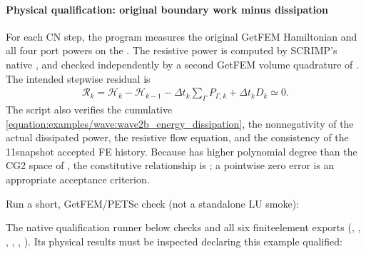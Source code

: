 \documentclass[letterpaper,10pt,english]{sphinxmanual}
\begin{document}
\paragraph{Physical qualification: original boundary work minus dissipation}
\label{\detokenize{examples/wave:physical-qualification-original-boundary-work-minus-dissipation}}
\sphinxAtStartPar
For each  CN step, the program measures the original
GetFEM Hamiltonian and all four port powers on the . The resistive power is computed by
SCRIMP’s native , and checked independently
by a second GetFEM volume quadrature of .
The intended stepwise residual is
\begin{equation*}
\begin{split}\mathcal R_k
=\mathcal H_k-\mathcal H_{k-1}
-\Delta t_k\sum_{\Gamma}P_{\Gamma,k}
+\Delta t_k D_k \simeq0.\end{split}
\end{equation*}
\sphinxAtStartPar
The script also verifies the cumulative
\eqref{equation:examples/wave:wave2b_energy_dissipation}, the nonnegativity
of the actual dissipated power, the resistive
flow equation, and the consistency of the
11\sphinxhyphen{}snapshot accepted FE history. Because
 has higher polynomial degree than
the CG2 space of , the constitutive
relationship is ;
a pointwise zero  error is 
an appropriate acceptance criterion.

\sphinxAtStartPar
Run a short,  GetFEM/PETSc check (not a
standalone LU smoke):

\begin{sphinxVerbatim}[commandchars=\\\{\}]
\end{sphinxVerbatim}

\sphinxAtStartPar
The native qualification runner below checks 
and all six finite\sphinxhyphen{}element exports (, ,
, , , ).
Its physical results must be inspected 
declaring this example qualified:
\end{document}

